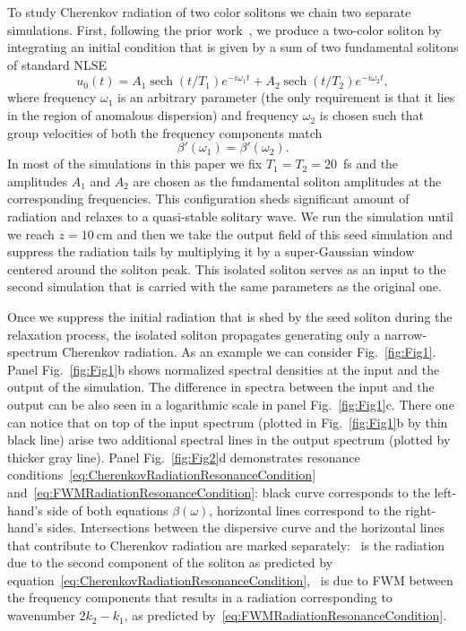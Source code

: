 \documentclass[aps, prl, twocolumn, superscriptaddress, final]{revtex4}
\DeclareMathOperator{\sech}{sech}
\newcommand*\circled[1]{
  \tikz[baseline=(char.base)]{
    \node[shape=circle,draw,inner sep=0.5pt] (char) {#1};
  }
}
\begin{document}
To study Cherenkov radiation of two color solitons we chain two separate simulations. First, following the prior work~\cite{melchert2019soliton}, we produce a two-color soliton by integrating an initial condition that is given by a sum of two fundamental solitons of standard NLSE
\begin{equation}
  \label{eq:SeedInitialCondition}
  u_{0}(t) =
      A_{1} \sech(t / T_{1}) e^{-i \omega_{1} t} +
      A_{2} \sech(t / T_{2}) e^{-i \omega_{2} t},
\end{equation}
where frequency $\omega_{1}$ is an arbitrary parameter (the only requirement is that it lies in the region of anomalous dispersion) and frequency $\omega_{2}$ is chosen such that group velocities of both the frequency components match
\begin{equation*}
  \beta'(\omega_{1}) = \beta'(\omega_{2}).
\end{equation*}
In most of the simulations in this paper we fix $T_{1} = T_{2} = 20$~fs and the amplitudes $A_{1}$ and $A_{2}$ are chosen as the fundamental soliton amplitudes at the corresponding frequencies. This configuration sheds significant amount of radiation and relaxes to a quasi-stable solitary wave. We run the simulation until we reach $z = 10~\text{cm}$ and then we take the output field of this seed simulation and suppress the radiation tails by multiplying it by a super-Gaussian window centered around the soliton peak. This isolated soliton serves as an input to the second simulation that is carried with the same parameters as the original one.

Once we suppress the initial radiation that is shed by the seed soliton during the relaxation process, the isolated soliton propagates generating only a narrow-spectrum Cherenkov radiation. As an example we can consider Fig.~\ref{fig:Fig1}. Panel Fig.~\ref{fig:Fig1}b shows normalized spectral densities at the input and the output of the simulation. The difference in spectra between the input and the output can be also seen in a logarithmic scale in panel Fig.~\ref{fig:Fig1}c. There one can notice that on top of the input spectrum (plotted in Fig.~\ref{fig:Fig1}b by thin black line) arise two additional spectral lines in the output spectrum (plotted by thicker gray line). Panel Fig.~\ref{fig:Fig2}d demonstrates resonance conditions~\eqref{eq:CherenkovRadiationResonanceCondition} and~\eqref{eq:FWMRadiationResonanceCondition}: black curve corresponds to the left-hand's side of both equations $\beta(\omega)$, horizontal lines correspond to the right-hand's sides. Intersections between the dispersive curve and the horizontal lines that contribute to Cherenkov radiation are marked separately: \circled{1}~is the radiation due to the second component of the soliton as predicted by equation~\eqref{eq:CherenkovRadiationResonanceCondition}, \circled{2}~is due to FWM between the frequency components that results in a radiation corresponding to wavenumber $2 k_{2} - k_{1}$, as predicted by~\eqref{eq:FWMRadiationResonanceCondition}.
\end{document}
